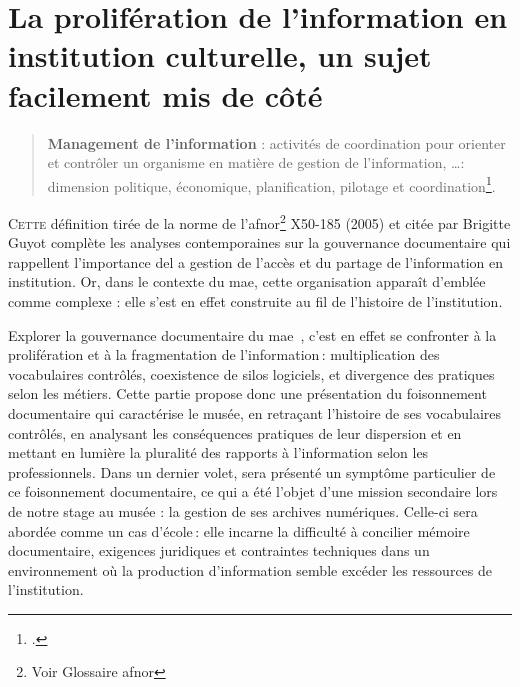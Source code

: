 \documentclass[12pt,twoside]{book}
\newcommand{\mae}{\ac{mae}} %
\newcommand{\maelong}{\acf{mae}} %
\begin{document}
	\part{La prolifération de l'information en institution culturelle, un sujet facilement mis de côté}
	
	
	\begin{quote}
		\textbf{Management de l'information} : \og activités de coordination pour orienter et contrôler un organisme en matière de gestion de l’information, \dots : dimension politique, économique, planification, pilotage et coordination\footcite{guyotManagementLinformationDans2012}.\fg
	\end{quote}
	
	\lettrine{C}{ette} définition tirée de la norme de l'\gls{afnor}\footnote{Voir Glossaire \gls{afnor}} X50-185 (2005) et citée par Brigitte Guyot complète les analyses contemporaines sur la gouvernance documentaire qui rappellent l'importance del a gestion de l'accès et du partage de l'information en institution. Or, dans le contexte du \mae, cette organisation apparaît d’emblée comme complexe : elle s'est en effet construite au fil de l'histoire de l'institution. 
	
	Explorer la gouvernance documentaire du \maelong~, c’est en effet se confronter à la prolifération et à la fragmentation de l’information : multiplication des vocabulaires contrôlés, coexistence de silos logiciels, et divergence des pratiques selon les métiers. Cette partie propose donc une présentation du foisonnement documentaire qui caractérise le musée, en retraçant l’histoire de ses vocabulaires contrôlés, en analysant les conséquences pratiques de leur dispersion et en mettant en lumière la pluralité des rapports à l’information selon les professionnels. Dans un dernier volet, sera présenté un symptôme particulier de ce foisonnement documentaire, ce qui a été l'objet d'une mission secondaire lors de notre stage au musée : la gestion de ses archives numériques. Celle-ci sera abordée comme un cas d’école : elle incarne la difficulté à concilier mémoire documentaire, exigences juridiques et contraintes techniques dans un environnement où la production d’information semble excéder les ressources de l’institution.
	
	
	
	
	
	
	
	
\end{document}
